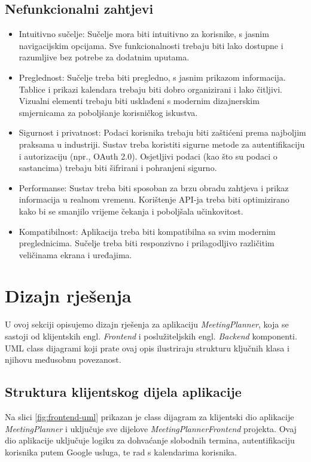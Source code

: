 \documentclass{foi}
\begin{document}
\subsection{Nefunkcionalni zahtjevi}
\begin{itemize}
    \item Intuitivno sučelje: Sučelje mora biti intuitivno za korisnike, s jasnim navigacijskim opcijama. Sve funkcionalnosti trebaju biti lako dostupne i razumljive bez potrebe za dodatnim uputama.
    \item Preglednost: Sučelje treba biti pregledno, s jasnim prikazom informacija. Tablice i prikazi kalendara trebaju biti dobro organizirani i lako čitljivi. Vizualni elementi trebaju biti usklađeni s modernim dizajnerskim smjernicama za poboljšanje korisničkog iskustva.
    \item Sigurnost i privatnost: Podaci korisnika trebaju biti zaštićeni prema najboljim praksama u industriji. Sustav treba koristiti sigurne metode za autentifikaciju i autorizaciju (npr., OAuth 2.0). Osjetljivi podaci (kao što su podaci o sastancima) trebaju biti šifrirani i pohranjeni sigurno.
    \item Performanse: Sustav treba biti sposoban za brzu obradu zahtjeva i prikaz informacija u realnom vremenu. Korištenje API-ja treba biti optimizirano kako bi se smanjilo vrijeme čekanja i poboljšala učinkovitost.
    \item Kompatibilnost: Aplikacija treba biti kompatibilna sa svim modernim preglednicima. Sučelje treba biti responzivno i prilagodljivo različitim veličinama ekrana i uređajima.
\end{itemize}
\section{Dizajn rješenja}

U ovoj sekciji opisujemo dizajn rješenja za aplikaciju \textit{MeetingPlanner}, koja se sastoji od klijentskih {engl. \textit{Frontend}} i poslužiteljskih {engl. \textit{Backend}} komponenti. UML class dijagrami koji prate ovaj opis ilustriraju strukturu ključnih klasa i njihovu međusobnu povezanost.

\subsection{Struktura klijentskog dijela aplikacije}

Na slici \ref{fig:frontend-uml} prikazan je class dijagram za klijentski dio aplikacije \textit{MeetingPlanner} i uključuje sve dijelove \textit{MeetingPlannerFrontend} projekta. Ovaj dio aplikacije uključuje logiku za dohvaćanje slobodnih termina, autentifikaciju korisnika putem Google usluga, te rad s kalendarima korisnika.
\end{document}
